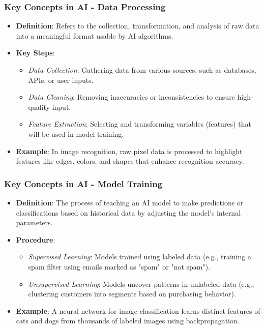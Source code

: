 \documentclass[aspectratio=169]{beamer}
\begin{document}
\begin{frame}[fragile]
    \frametitle{Key Concepts in AI - Data Processing}
    \begin{itemize}
        \item \textbf{Definition}: Refers to the collection, transformation, and analysis of raw data into a meaningful format usable by AI algorithms.
        \item \textbf{Key Steps}:
        \begin{itemize}
            \item \textit{Data Collection}: Gathering data from various sources, such as databases, APIs, or user inputs.
            \item \textit{Data Cleaning}: Removing inaccuracies or inconsistencies to ensure high-quality input.
            \item \textit{Feature Extraction}: Selecting and transforming variables (features) that will be used in model training.
        \end{itemize}
        \item \textbf{Example}: In image recognition, raw pixel data is processed to highlight features like edges, colors, and shapes that enhance recognition accuracy.
    \end{itemize}
\end{frame}

\begin{frame}[fragile]
    \frametitle{Key Concepts in AI - Model Training}
    \begin{itemize}
        \item \textbf{Definition}: The process of teaching an AI model to make predictions or classifications based on historical data by adjusting the model's internal parameters.
        \item \textbf{Procedure}:
        \begin{itemize}
            \item \textit{Supervised Learning}: Models trained using labeled data (e.g., training a spam filter using emails marked as "spam" or "not spam").
            \item \textit{Unsupervised Learning}: Models uncover patterns in unlabeled data (e.g., clustering customers into segments based on purchasing behavior).
        \end{itemize}
        \item \textbf{Example}: A neural network for image classification learns distinct features of cats and dogs from thousands of labeled images using backpropagation.
    \end{itemize}
\end{frame}
\end{document}
